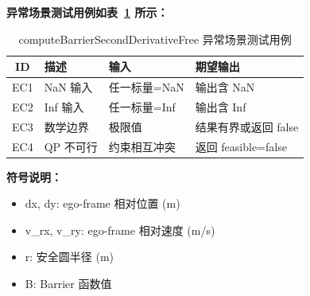 \documentclass[a4paper,10pt]{article}
\begin{document}
\noindent\textbf{异常场景测试用例如表~\ref{tab:abnormal_computeBarrierSecondDerivativeFree} 所示：}
\begin{table}[h]
\centering
\caption{computeBarrierSecondDerivativeFree 异常场景测试用例}
\label{tab:abnormal_computeBarrierSecondDerivativeFree}
\begin{tabular}{|c|p{3.5cm}|p{3.5cm}|p{3.5cm}|}
\hline
ID & 描述 & 输入 & 期望输出 \\ \hline
  EC1 & NaN 输入 & 任一标量=NaN & 输出含 NaN \\ \hline
  EC2 & Inf 输入 & 任一标量=Inf & 输出含 Inf \\ \hline
  EC3 & 数学边界 & 极限值 & 结果有界或返回 false \\ \hline
  EC4 & QP 不可行 & 约束相互冲突 & 返回 feasible=false \\ \hline
\end{tabular}
\end{table}

\noindent\textbf{符号说明：}
\begin{itemize}
  \item dx, dy: ego-frame 相对位置 (m)
  \item v\_rx, v\_ry: ego-frame 相对速度 (m/s)
  \item r: 安全圆半径 (m)
  \item B: Barrier 函数值
\end{itemize}
\end{document}
